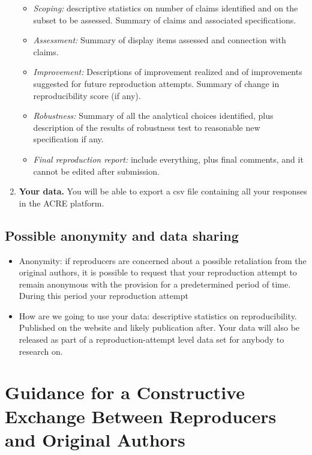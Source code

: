 \documentclass[]{book}
\providecommand{\tightlist}{%
  \setlength{\itemsep}{0pt}\setlength{\parskip}{0pt}}
\begin{document}
\begin{enumerate}
  \begin{itemize}
  \tightlist
  \item
    \emph{Scoping:} descriptive statistics on number of claims identified and on the subset to be assessed. Summary of claims and associated specifications.
  \item
    \emph{Assessment:} Summary of display items assessed and connection with claims.
  \item
    \emph{Improvement:} Descriptions of improvement realized and of improvements suggested for future reproduction attempts. Summary of change in reproducibility score (if any).
  \item
    \emph{Robustness:} Summary of all the analytical choices identified, plus description of the results of robustness test to reasonable new specification if any.\\
  \item
    \emph{Final reproduction report:} include everything, plus final comments, and it cannot be edited after submission.
  \end{itemize}
\item
  \textbf{Your data.} You will be able to export a csv file containing all your responses in the ACRE platform.
\end{enumerate}

\hypertarget{possible-anonymity-and-data-sharing}{%
\section{Possible anonymity and data sharing}\label{possible-anonymity-and-data-sharing}}

\begin{itemize}
\item
  Anonymity: if reproducers are concerned about a possible retaliation from the original authors, it is possible to request that your reproduction attempt to remain anonymous with the provision for a predetermined period of time. During this period your reproduction attempt
\item
  How are we going to use your data: descriptive statistics on reproducibility. Published on the website and likely publication after. Your data will also be released as part of a reproduction-attempt level data set for anybody to research on.
\end{itemize}

\hypertarget{guidance-for-a-constructive-exchange-between-reproducers-and-original-authors}{%
\chapter{Guidance for a Constructive Exchange Between Reproducers and Original Authors}\label{guidance-for-a-constructive-exchange-between-reproducers-and-original-authors}}
\end{document}
